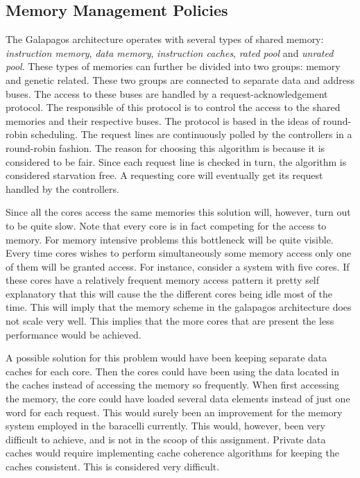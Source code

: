 \subsection{Memory Management Policies}

The Galapagos architecture operates with several types of shared memory: \emph{instruction memory}, \emph{data memory}, \emph{instruction caches}, \emph{rated pool} and \emph{unrated pool}.
These types of memories  can further be divided into two groups: memory and genetic related.
These two groups are connected to separate data and address buses.
The access to these buses are handled by a request-acknowledgement protocol.
The responsible of this protocol is to control the access to the shared memories and their respective buses.
The protocol is based in the ideas of round-robin scheduling.
The request lines are continuously polled by the controllers in a round-robin fashion.
The reason for choosing this algorithm is because it is considered to be fair.
Since each request line is checked in turn, the algorithm is considered starvation free.
A requesting core will eventually get its request handled by the controllers.


Since all the cores access the same memories this solution will, however, turn out to be quite slow.
Note that every core is in fact competing for the access to memory.
For memory intensive problems this bottleneck will be quite visible.
Every time cores wishes to perform simultaneously some memory access only one of them will be granted access.
For instance, consider a system with five cores.
If these cores have a relatively frequent memory access pattern it pretty self explanatory that this will cause the the different cores being idle most of the time.
This will imply that the memory scheme in the galapagos architecture does not scale very well.
This implies that the more cores that are present the less performance would be achieved.


A possible solution for this problem would have been keeping separate data caches for each core.
Then the cores could have been using the data located in the caches instead of accessing the memory so frequently.
When first accessing the memory, the core could have loaded several data elements instead of just one word for each request.
This would surely been an improvement for the memory system employed in the baracelli currently.
This would, however, been very difficult to achieve, and is not in the scoop of this assignment.
Private data caches would require implementing cache coherence algorithms for keeping the caches consistent.
This is considered very difficult.



